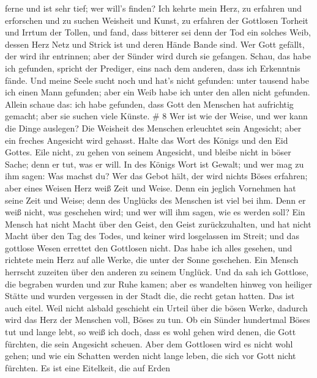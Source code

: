 ferne und ist sehr tief; wer will's finden?  Ich kehrte
mein Herz, zu erfahren und erforschen und zu suchen Weisheit und Kunst,
zu erfahren der Gottlosen Torheit und Irrtum der Tollen, 
und fand, dass bitterer sei denn der Tod ein solches Weib, dessen Herz
Netz und Strick ist und deren Hände Bande sind. Wer Gott gefällt, der
wird ihr entrinnen; aber der Sünder wird durch sie gefangen.
 Schau, das habe ich gefunden, spricht der Prediger, eins
nach dem anderen, dass ich Erkenntnis fände.  Und meine
Seele sucht noch und hat's nicht gefunden: unter tausend habe ich einen
Mann gefunden; aber ein Weib habe ich unter den allen nicht gefunden.
 Allein schaue das: ich habe gefunden, dass Gott den
Menschen hat aufrichtig gemacht; aber sie suchen viele Künste. \# 8
 Wer ist wie der Weise, und wer kann die Dinge auslegen? Die
Weisheit des Menschen erleuchtet sein Angesicht; aber ein freches
Angesicht wird gehasst.  Halte das Wort des Königs und den
Eid Gottes.  Eile nicht, zu gehen von seinem Angesicht, und
bleibe nicht in böser Sache; denn er tut, was er will.  In
des Königs Wort ist Gewalt; und wer mag zu ihm sagen: Was machst du?
 Wer das Gebot hält, der wird nichts Böses erfahren; aber
eines Weisen Herz weiß Zeit und Weise.  Denn ein jeglich
Vornehmen hat seine Zeit und Weise; denn des Unglücks des Menschen ist
viel bei ihm.  Denn er weiß nicht, was geschehen wird; und
wer will ihm sagen, wie es werden soll?  Ein Mensch hat
nicht Macht über den Geist, den Geist zurückzuhalten, und hat nicht
Macht über den Tag des Todes, und keiner wird losgelassen im Streit; und
das gottlose Wesen errettet den Gottlosen nicht.  Das habe
ich alles gesehen, und richtete mein Herz auf alle Werke, die unter der
Sonne geschehen. Ein Mensch herrscht zuzeiten über den anderen zu seinem
Unglück.  Und da sah ich Gottlose, die begraben wurden und
zur Ruhe kamen; aber es wandelten hinweg von heiliger Stätte und wurden
vergessen in der Stadt die, die recht getan hatten. Das ist auch eitel.
 Weil nicht alsbald geschieht ein Urteil über die bösen
Werke, dadurch wird das Herz der Menschen voll, Böses zu tun.
 Ob ein Sünder hundertmal Böses tut und lange lebt, so weiß
ich doch, dass es wohl gehen wird denen, die Gott fürchten, die sein
Angesicht scheuen.  Aber dem Gottlosen wird es nicht wohl
gehen; und wie ein Schatten werden nicht lange leben, die sich vor Gott
nicht fürchten.  Es ist eine Eitelkeit, die auf Erden
